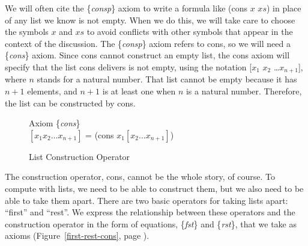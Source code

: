 
We will often cite the \{\emph{consp}\} axiom to write
a formula like (cons $x$ $xs$) in place of any list we know is not empty.
When we do this, we will take care to choose the symbols $x$ and $xs$
to avoid conflicts with other symbols that appear in the context of the discussion.
The \{\emph{consp}\} axiom refers to cons, so we will need a \{\emph{cons}\} axiom.
Since cons cannot construct an empty list,
the cons axiom will specify that the list cons delivers is not empty,
using the notation [$x_1$ $x_2$ \dots $x_{n+1}$],
where $n$ stands for a natural number.
That list cannot be empty because it has $n+1$ elements, and $n+1$
is at least one when $n$ is a natural number.
Therefore, the list can be constructed by cons.
\begin{figure}
\begin{center}
Axiom \{\emph{cons}\} \\
$[x_1 x_2 \dots x_{n+1}]$ = (cons $x_1 [x_2 \dots x_{n+1}]$)
\end{center}
\caption{List Construction Operator}
\label{cons-axiom}
\end{figure}

The construction operator, cons, cannot be the whole story, of course.
To compute with lists, we  need to be able to construct them,
but we also need to be able to take them apart.
There are two basic operators for taking lists apart: ``first'' and ``rest''.
We express the relationship between these operators and
the construction operator in the form of equations,
\{\emph{fst}\} and \{\emph{rst}\}, that we take as axioms
(Figure~\ref{first-rest-cons}, page \pageref{first-rest-cons}).

